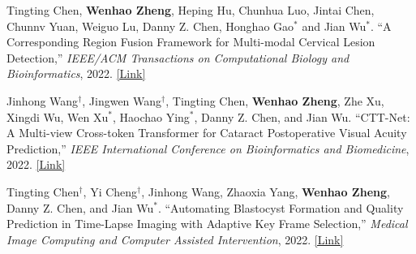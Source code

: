 \begin{cventries}
{\begin{cvitemize2}
            \vspace{1mm}
            \item Tingting Chen, \textbf{Wenhao Zheng}, Heping Hu, Chunhua Luo, Jintai Chen, Chunnv Yuan, Weiguo Lu, Danny Z. Chen, Honghao Gao$^*$ and Jian Wu$^*$. ``A Corresponding Region Fusion Framework for Multi-modal Cervical Lesion Detection,'' \textit{IEEE/ACM Transactions on Computational Biology and Bioinformatics}, 2022. \href{https://ieeexplore.ieee.org/document/9784879}{\textcolor{link}{[Link]}}
            \vspace{1mm}
            \item Jinhong Wang$^\dagger$, Jingwen Wang$^\dagger$, Tingting Chen, \textbf{Wenhao Zheng}, Zhe Xu, Xingdi Wu, Wen Xu$^*$, Haochao Ying$^*$, Danny Z. Chen, and Jian Wu. ``CTT-Net: A Multi-view Cross-token Transformer for Cataract Postoperative Visual Acuity Prediction,'' \textit{IEEE International Conference on Bioinformatics and Biomedicine}, 2022. \href{https://ieeexplore.ieee.org/document/9995392}{\textcolor{link}{[Link]}}
            \vspace{1mm}
            \item Tingting Chen$^\dagger$, Yi Cheng$^\dagger$, Jinhong Wang, Zhaoxia Yang, \textbf{Wenhao Zheng}, Danny Z. Chen, and Jian Wu$^*$. ``Automating Blastocyst Formation and Quality Prediction in Time-Lapse Imaging with Adaptive Key Frame Selection,'' \textit{Medical Image Computing and Computer Assisted Intervention}, 2022. \href{https://link.springer.com/chapter/10.1007/978-3-031-16440-8_43}{\textcolor{link}{[Link]}}
        \end{cvitemize2}
    }

\end{cventries}

